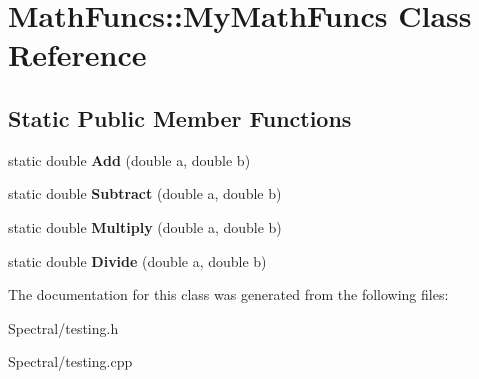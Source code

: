\hypertarget{class_math_funcs_1_1_my_math_funcs}{\section{Math\+Funcs\+:\+:My\+Math\+Funcs Class Reference}
\label{class_math_funcs_1_1_my_math_funcs}
}
\subsection*{Static Public Member Functions}
\begin{DoxyCompactItemize}
\item 
\hypertarget{class_math_funcs_1_1_my_math_funcs_a0840754509ebe7897a584b66e2d7c1e0}{static double {\bfseries Add} (double a, double b)}\label{class_math_funcs_1_1_my_math_funcs_a0840754509ebe7897a584b66e2d7c1e0}

\item 
\hypertarget{class_math_funcs_1_1_my_math_funcs_a3449d4adf096c39017e55fb47a906506}{static double {\bfseries Subtract} (double a, double b)}\label{class_math_funcs_1_1_my_math_funcs_a3449d4adf096c39017e55fb47a906506}

\item 
\hypertarget{class_math_funcs_1_1_my_math_funcs_a5bcbd3169ade93e307d3795edb7f7940}{static double {\bfseries Multiply} (double a, double b)}\label{class_math_funcs_1_1_my_math_funcs_a5bcbd3169ade93e307d3795edb7f7940}

\item 
\hypertarget{class_math_funcs_1_1_my_math_funcs_a7e1f4f1a894572a2401a3d4114a3eb27}{static double {\bfseries Divide} (double a, double b)}\label{class_math_funcs_1_1_my_math_funcs_a7e1f4f1a894572a2401a3d4114a3eb27}

\end{DoxyCompactItemize}


The documentation for this class was generated from the following files\+:\begin{DoxyCompactItemize}
\item 
Spectral/testing.\+h\item 
Spectral/testing.\+cpp\end{DoxyCompactItemize}

